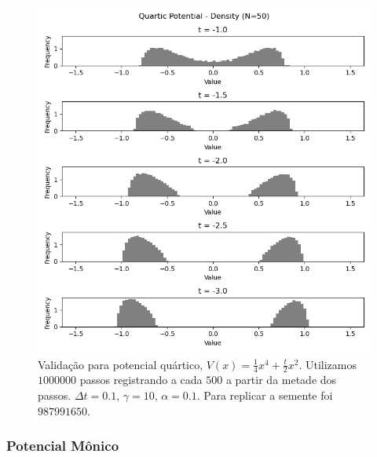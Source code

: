 \begin{center}
	\begin{figure}
		\includegraphics[scale=0.9]{images/validationArticleQuartic}
		\caption{Validação para potencial quártico, $V(x) = \frac{1}{4} x^4 + \frac{t}{2} x^2$. Utilizamos $1000000$ passos registrando a cada $500$ a partir da metade dos passos. $\Delta t = 0.1$, $\gamma = 10$, $\alpha = 0.1$. Para replicar a semente foi $987991650$.}
	\end{figure}
\end{center}

\subsubsection{Potencial Mônico}

